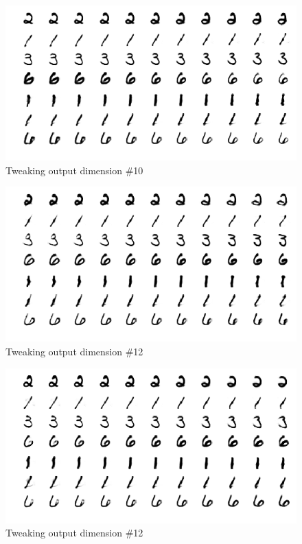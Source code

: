 \documentclass[10pt,twocolumn,letterpaper]{article}
\begin{document}
\begin{figure}[ht]
	\includegraphics[width=\columnwidth]{j10}
	\caption{Tweaking output dimension \#10}
\end{figure}
\begin{figure}[ht]
	\includegraphics[width=\columnwidth]{j11}
	\caption{Tweaking output dimension \#12}
\end{figure}
\begin{figure}[ht]
	\includegraphics[width=\columnwidth]{j12}
	\caption{Tweaking output dimension \#12}
\end{figure}
\end{document}
